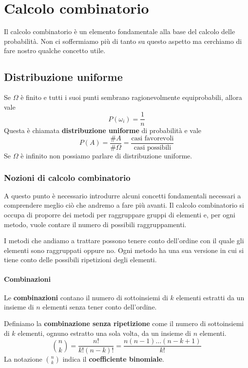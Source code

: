 \chapter{Calcolo combinatorio}
Il calcolo combinatorio è un elemento fondamentale alla base del calcolo delle probabilità. Non ci
soffermiamo più di tanto su questo aspetto ma cerchiamo di fare nostro qualche concetto utile.

\section{Distribuzione uniforme}
Se $\Omega$ è finito e tutti i suoi punti sembrano ragionevolmente equiprobabili, allora vale
\[ P(\omega_i) = \frac{1}{n} \]
Questa è chiamata \textbf{distribuzione uniforme} di probabilità e vale
\[ P(A) = \frac{\# A}{\# \Omega} = \frac{\text{casi favorevoli}}{\text{casi possibili}} \]
Se $\Omega$ è infinito non possiamo parlare di distribuzione uniforme.

\subsection{Nozioni di calcolo combinatorio}
A questo punto è necessario introdurre alcuni concetti fondamentali necessari a comprendere meglio
ciò che andremo a fare più avanti. Il calcolo combinatorio si occupa di proporre dei metodi per
raggruppare gruppi di elementi e, per ogni metodo, vuole contare il numero di possibili
raggruppamenti.

I metodi che andiamo a trattare possono tenere conto dell'ordine con il quale gli elementi sono
raggruppati oppure no. Ogni metodo ha una sua versione in cui si tiene conto delle possibili 
ripetizioni degli elementi.

\subsubsection{Combinazioni}
Le \textbf{combinazioni} contano il numero di sottoinsiemi di $k$ elementi estratti da un insieme di
$n$ elementi senza tener conto dell'ordine.

\begin{definition}
	Definiamo la \textbf{combinazione senza ripetizione} come il numero di sottoinsiemi di $k$ elementi,
	ognuno estratto una sola volta, da un insieme di $n$ elementi.
	\[ \binom{n}{k} = \frac{n!}{k! (n-k)!} = \frac{n (n-1) \dots (n-k+1)}{k!} \]
	La notazione $\binom{n}{k}$ indica il \textbf{coefficiente binomiale}.
\end{definition}

